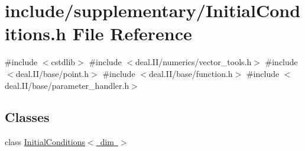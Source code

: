 \section{include/supplementary/\+Initial\+Conditions.h File Reference}
\label{_initial_conditions_8h}
{\ttfamily \#include $<$cstdlib$>$}\newline
{\ttfamily \#include $<$deal.\+I\+I/numerics/vector\+\_\+tools.\+h$>$}\newline
{\ttfamily \#include $<$deal.\+I\+I/base/point.\+h$>$}\newline
{\ttfamily \#include $<$deal.\+I\+I/base/function.\+h$>$}\newline
{\ttfamily \#include $<$deal.\+I\+I/base/parameter\+\_\+handler.\+h$>$}\newline
\subsection*{Classes}
\begin{DoxyCompactItemize}
\item 
class \mbox{\hyperlink{class_initial_conditions}{Initial\+Conditions$<$ dim $>$}}
\end{DoxyCompactItemize}
